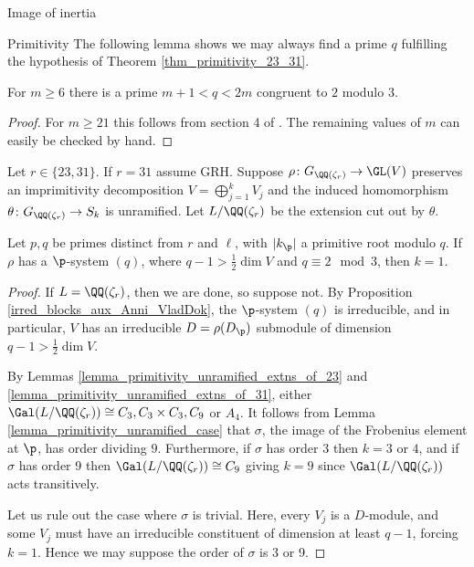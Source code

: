 \documentclass[11pt,a4paper]{article}
\newcommand{\Gcyclo}[1]{G_{\QQ(\zeta_{#1})}}
\begin{document}
\begin{section}{Image of inertia}
\begin{subsection}{Primitivity}
The following lemma shows we may always find a prime $q$ fulfilling the hypothesis of Theorem \ref{thm_primitivity_23_31}.
\begin{lemma}
\label{lemma_prim_bertrand_postulate}
For $m \geq 6$ there is a prime $m+1< q < 2m$ congruent to $2$ modulo $3$.
\end{lemma}

\begin{proof}
For $m \geq 21$ this follows from section 4 of \cite{Moree_Bertrands_postulate_primes_in_Arithmetic_progressions}.
The remaining values of $m$ can easily be checked by hand.
\end{proof}


\begin{theorem}
\label{thm_primitivity_23_31}
Let $ r\in \{23,31\}$. If $r=31$ assume GRH.
Suppose $\rho\colon \Gcyclo{r} \rightarrow \GL(V)$ preserves an imprimitivity decomposition $V=\bigoplus^{k}_{j=1}V_j$ and the induced homomorphism $\theta\colon \Gcyclo{r} \rightarrow S_k$ is unramified.
Let $L/\QQ(\zeta_{r})$ be the extension cut out by $\theta$.

Let $p,q$ be primes distinct from $r$ and $\ell$, with $|k_\p|$ a primitive root modulo $q$.
If $\rho$ has a  $\p$-system $(q)$, where $q-1> \frac{1}{2}\dim V$ and $q \equiv 2 \mod{3}$, then $k=1$. 
\end{theorem}

\begin{proof}
If $L=\QQ(\zeta_{r})$, then we are done, so suppose not.
By Proposition \ref{irred_blocks_aux_Anni_VladDok}, the $\p$-system $(q)$ is irreducible, and in particular, $V$ has an irreducible $D=\rho(D_\p)$ submodule of dimension $q-1> \frac{1}{2} \dim V$.

By Lemmas \ref{lemma_primitivity_unramified_extns_of_23} and \ref{lemma_primitivity_unramified_extns_of_31}, either $\Gal(L/\QQ(\zeta_r)) \cong C_3, C_3 \times C_3, C_9$ or $A_4$.
It follows from Lemma \ref{lemma_primitivity_unramified_case} that $\sigma$, the image of the Frobenius element at $\p$, has order dividing $9$. Furthermore, if $\sigma$ has order 3 then $k=3$ or $4$, and if $\sigma$ has order 9 then $\Gal(L/\QQ(\zeta_r)) \cong C_9$ giving $k=9$ since $\Gal(L/\QQ(\zeta_r))$ acts transitively.

Let us rule out the case where $\sigma$ is trivial. Here, every $V_j$ is a $D$-module, and some $V_j$ must have an irreducible constituent of dimension at least $q-1$, forcing $k=1$. Hence we may suppose the order of $\sigma$ is 3 or 9.



\end{proof}
\end{subsection}
\end{section}
\end{document}
